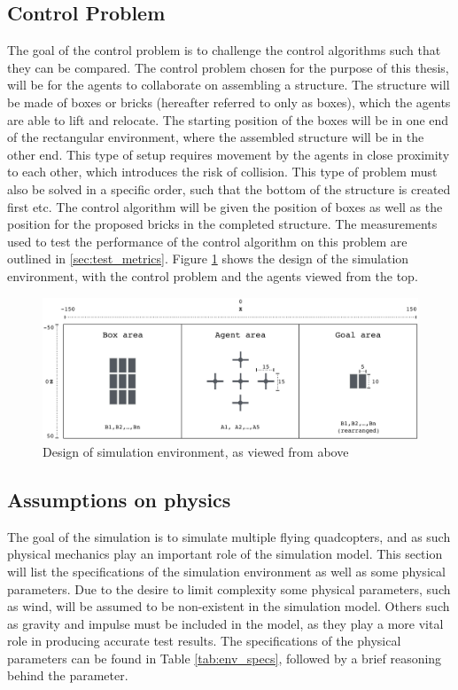 \subsection{Control Problem}
\label{sec:control_problem}
The goal of the control problem is to challenge the control algorithms such that they can be compared. The control problem chosen for the purpose of this thesis, will be for the agents to collaborate on assembling a structure. The structure will be made of boxes or bricks (hereafter referred to only as boxes), which the agents are able to lift and relocate. The starting position of the boxes will be in one end of the rectangular environment, where the assembled structure will be in the other end. This type of setup requires movement by the agents in close proximity to each other, which introduces the risk of collision. This type of problem must also be solved in a specific order, such that the bottom of the structure is created first etc.
The control algorithm will be given the position of boxes as well as the position for the proposed bricks in the completed structure.
The measurements used to test the performance of the control algorithm on this problem are outlined in \ref{sec:test_metrics}. Figure \ref{fig:2d_overview} shows the design of the simulation environment, with the control problem and the agents viewed from the top.

\begin{figure}[H]
  \centering
  \includegraphics[width=1\columnwidth]{figures/2d_overview}
  \caption{\label{fig:2d_overview}Design of simulation environment, as viewed from above}
\end{figure}

\subsection{Assumptions on physics}
\label{sec:physics}

The goal of the simulation is to simulate multiple flying quadcopters, and as such physical mechanics play an important role of the simulation model. This section will list the specifications of the simulation environment as well as some physical parameters. Due to the desire to limit complexity some physical parameters, such as wind, will be assumed to be non-existent in the simulation model. Others such as gravity and impulse must be included in the model, as they play a more vital role in producing accurate test results. The specifications of the physical parameters can be found in Table \ref{tab:env_specs}, followed by a brief reasoning behind the parameter.

